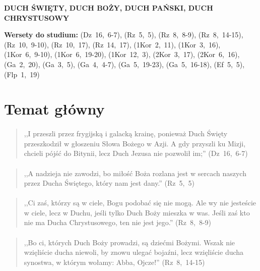 \documentclass[10pt,a4paper,oneside]{article}
\begin{document}
\centerline{\textbf{\MakeUppercase{Duch Święty, Duch Boży, Duch Pański, Duch Chrystusowy}}}
\begin{center}
\textbf{Wersety do studium:} 
\mbox{(Dz 16, 6-7)}, \mbox{(Rz 5, 5)}, \mbox{(Rz 8, 8-9)}, \mbox{(Rz 8, 14-15)}, \mbox{(Rz 10, 9-10)}, \mbox{(Rz 10, 17)}, \mbox{(Rz 14, 17)}, \mbox{(1Kor 2, 11)}, \mbox{(1Kor 3, 16)}, \mbox{(1Kor 6, 9-10)}, \mbox{(1Kor 6, 19-20)}, \mbox{(1Kor 12, 3)}, \mbox{(2Kor 3, 17)}, \mbox{(2Kor 6, 16)}, \mbox{(Ga 2, 20)}, \mbox{(Ga 3, 5)}, \mbox{(Ga 4, 4-7)}, \mbox{(Ga 5, 19-23)}, \mbox{(Ga 5, 16-18)}, \mbox{(Ef 5, 5)}, \mbox{(Flp 1, 19)}
\end{center}
\section{Temat główny}
\paragraph{}
\begin{quote}
,,I przeszli przez frygijską i galacką krainę, ponieważ Duch Święty przeszkodził w głoszeniu Słowa Bożego w Azji. A gdy przyszli ku Mizji, chcieli pójść do Bitynii, lecz Duch Jezusa nie pozwolił im;'' \mbox{(Dz 16, 6-7)}
\end{quote}
\paragraph{}
\begin{quote}
,,A nadzieja nie zawodzi, bo miłość Boża rozlana jest w sercach naszych przez Ducha Świętego, który nam jest dany.'' \mbox{(Rz 5, 5)}
\end{quote}
\paragraph{}
\begin{quote}
,,Ci zaś, którzy są w ciele, Bogu podobać się nie mogą. Ale wy nie jesteście w ciele, lecz w Duchu, jeśli tylko Duch Boży mieszka w was. Jeśli zaś kto nie ma Ducha Chrystusowego, ten nie jest jego.'' \mbox{(Rz 8, 8-9)}
\end{quote}
\paragraph{}
\begin{quote}
,,Bo ci, których Duch Boży prowadzi, są dziećmi Bożymi. Wszak nie wzięliście ducha niewoli, by znowu ulegać bojaźni, lecz wzięliście ducha synostwa, w którym wołamy: Abba, Ojcze!'' \mbox{(Rz 8, 14-15)}
\end{quote}
\end{document}
